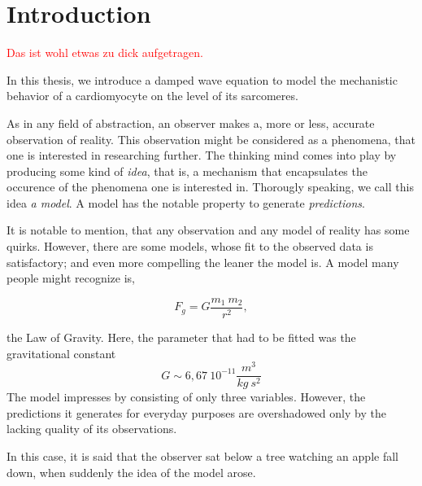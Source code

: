 \chapter*{Introduction}
	\textcolor{red}{Das ist wohl etwas zu dick aufgetragen.}



	In this thesis, we introduce a damped wave equation to model the mechanistic behavior of a cardiomyocyte on the level of its sarcomeres. 


	As in any field of abstraction, an observer makes a, more or less, accurate observation of reality. This observation might be considered as a phenomena, that one is interested in researching further. The thinking mind comes into play by producing some kind of \textit{idea}, that is, a mechanism that encapsulates the occurence of the phenomena one is interested in. Thorougly speaking, we call this idea \textit{a model}. A model has the notable property to generate \textit{predictions}.

It is notable to mention, that any observation and any model of reality  has some quirks. However, there are some models, whose fit to the observed data is satisfactory; and even more compelling the leaner the model is. A model many people might recognize is,

\begin{equation*}
	F_g = G \frac{m_1 \ m_2}{r^2},
\end{equation*}

the Law of Gravity. Here, the parameter that had to be fitted was the gravitational constant
\begin{equation*}
	G  \sim 6,67 \ 10^{-11} \frac{m^3}{kg \ s^2}
\end{equation*}
The model impresses by consisting of only three variables. However, the predictions it generates for everyday purposes are overshadowed only by the lacking quality of its observations.

In this case, it is said that the observer sat below a tree watching an apple fall down, when suddenly the idea of the model arose.





